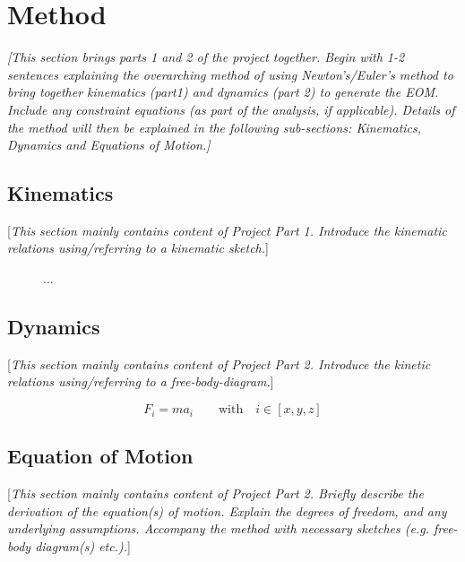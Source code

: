 \documentclass[11pt]{article}
\begin{document}
\section*{Method}\label{sec:method}
\textcolor[rgb]{0.80,0.29,0.09}{\textsl{[This section brings parts 1 and 2 of the project together. Begin with 1-2 sentences explaining the overarching method of using Newton’s/Euler’s method to bring together kinematics (part1) and dynamics (part 2) to generate the EOM.  Include any constraint equations (as part of the analysis, if applicable). Details of the method will then be explained in the following sub-sections: Kinematics, Dynamics and Equations of Motion.]}}


\subsection*{Kinematics}\label{sec:kin}
[\textcolor[rgb]{0.80,0.29,0.09}{\textsl{This section mainly contains content of Project Part 1. Introduce the kinematic relations using/referring to a kinematic sketch.}}]
\begin{figure}[h!]
  \centering
  \caption{...}\label{fig:kin_sketch}
\end{figure}

\subsection*{Dynamics}\label{sec:dyn}
[\textcolor[rgb]{0.80,0.29,0.09}{\textsl{This section mainly contains content of Project Part 2. Introduce the kinetic relations using/referring to a free-body-diagram.}}] 

\begin{equation}\label{eq:dyn1}
  F_i = ma_i \qquad \mathrm{with}\quad i\in[x,y,z]
\end{equation}

\subsection*{Equation of Motion}\label{sec:eom}
[\textcolor[rgb]{0.80,0.29,0.09}{\textsl{This section mainly contains content of Project Part 2. Briefly describe the derivation of the equation(s) of motion. Explain the degrees of freedom, and any underlying assumptions. Accompany the method with necessary sketches (e.g. free-body diagram(s) etc.).}}]
\end{document}
